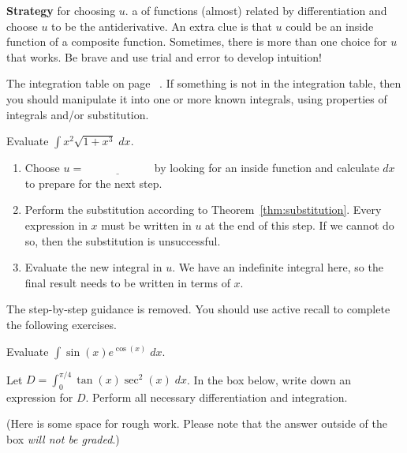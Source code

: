 \documentclass[../main.tex]{subfiles}
\begin{document}
\textbf{Strategy} for choosing \(u\).\label{page:u-sub-strategy}  a  of functions (almost) related by differentiation and choose \(u\) to be the antiderivative.  An extra clue is that \(u\) could be an inside function of a composite function. Sometimes, there is more than one choice for \(u\) that works. Be brave and use trial and error to develop intuition!

\faExclamationTriangle{} The integration table on page~\pageref{sec:integration-formulas} . If something is not in the integration table, then you should manipulate it into one or more known integrals, using properties of integrals and/or substitution.

\begin{example} \label{ex:u-sub-1}
  Evaluate \(\int x^{2} \sqrt{1 + x^{3}} \;dx\).

  \begin{enumerate}[wide]
    \item Choose \(u = \underline{\hspace{1in}}\) by looking for an inside function and calculate \(dx\) to prepare for the next step.


    \item Perform the substitution according to Theorem~\ref{thm:substitution}. Every expression in \(x\) must be written in \(u\) at the end of this step. If we cannot do so, then the substitution is unsuccessful. 


    \item Evaluate the new integral in \(u\). We have an indefinite integral here, so the final result needs to be written in terms of \(x\).

      \blanks*
  \end{enumerate}
\end{example}
\clearpage

The step-by-step guidance is removed. You should use active recall to complete the following exercises.
\begin{exercise}
  Evaluate \(\int \sin(x) e^{\cos(x)} \;dx\).

  \blanks*
\end{exercise}
\clearpage

\begin{exercise}
  Let \(D = \int_{0}^{\pi/4} \tan(x) \sec^{2}(x) \;dx\). In the box below, write down an expression for \(D\). Perform all necessary differentiation and integration.


  (Here is some space for rough work. Please note that the answer outside of the box \emph{will not be graded}.)

  \blanks*
\end{exercise}
\end{document}
